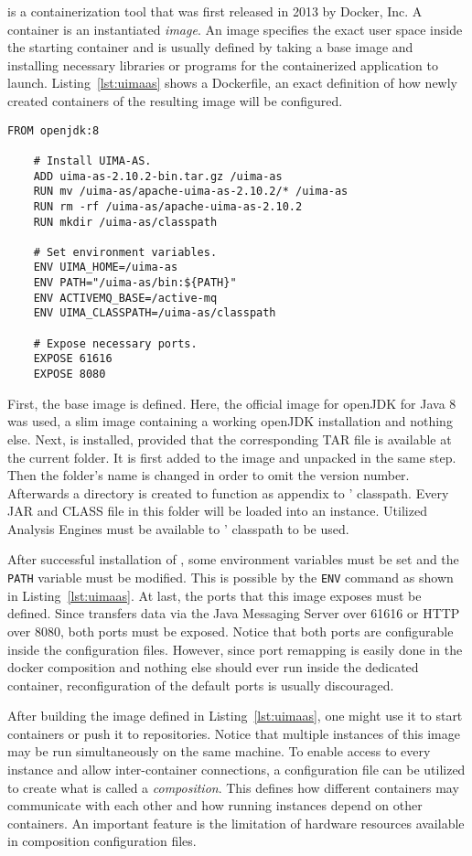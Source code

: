 \docker{} is a containerization tool that was first released in 2013 by Docker, Inc. A \docker{} container is an instantiated \emph{image}. An image specifies the exact user space inside the starting container and is usually defined by taking a base image and installing necessary libraries or programs for the containerized application to launch. Listing~\ref{lst:uimaas} shows a Dockerfile, an exact definition of how newly created containers of the resulting image will be configured.
\begin{lstlisting}[caption={An example Dockerfile for an UIMA-AS image.},label=lst:uimaas,morekeywords={FROM,ADD,RUN,ENV,EXPOSE},float]
	FROM openjdk:8
	
	# Install UIMA-AS.
	ADD uima-as-2.10.2-bin.tar.gz /uima-as
	RUN mv /uima-as/apache-uima-as-2.10.2/* /uima-as
	RUN rm -rf /uima-as/apache-uima-as-2.10.2
	RUN mkdir /uima-as/classpath
	
	# Set environment variables.
	ENV UIMA_HOME=/uima-as
	ENV PATH="/uima-as/bin:${PATH}"
	ENV ACTIVEMQ_BASE=/active-mq
	ENV UIMA_CLASSPATH=/uima-as/classpath
	
	# Expose necessary ports.
	EXPOSE 61616
	EXPOSE 8080
\end{lstlisting}
First, the base image is defined. Here, the official image for openJDK for Java 8 was used, a slim image containing a working openJDK installation and nothing else. Next, \uimaas{} is installed, provided that the corresponding TAR file is available at the current folder. It is first added to the image and unpacked in the same step. Then the folder's name is changed in order to omit the version number. Afterwards a directory is created to function as appendix to \uimaas{}' classpath. Every JAR and CLASS file in this folder will be loaded into an \uimaas{} instance. Utilized Analysis Engines must be available to \uimaas{}' classpath to be used.

After successful installation of \uimaas{}, some environment variables must be set and the \lstinline|PATH| variable must be modified. This is possible by the \lstinline[morekeywords={ENV}]|ENV| command as shown in Listing~\ref{lst:uimaas}. At last, the ports that this image exposes must be defined. Since \uimaas{} transfers data via the Java Messaging Server over 61616 or HTTP over 8080, both ports must be exposed. Notice that both ports are configurable inside the \uimaas{} configuration files. However, since port remapping is easily done in the docker composition and nothing else should ever run inside the dedicated \uimaas{} container, reconfiguration of the default ports is usually discouraged.

After building the image defined in Listing~\ref{lst:uimaas}, one might use it to start containers or push it to repositories. Notice that multiple instances of this image may be run simultaneously on the same machine. To enable access to every instance and allow inter-container connections, a configuration file can be utilized to create what is called a \emph{\docker{} composition}. This defines how different containers may communicate with each other and how running instances depend on other containers. An important feature is the limitation of hardware resources available in composition configuration files.
